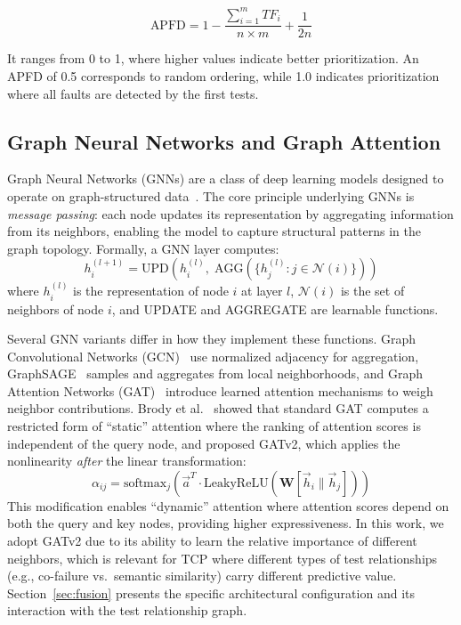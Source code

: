 \documentclass[10pt,journal,compsoc]{IEEEtran}
\begin{document}
\begin{equation}
    \text{APFD} = 1 - \frac{\sum_{i=1}^{m} TF_i}{n \times m} + \frac{1}{2n}
\end{equation}

It ranges from 0 to 1, where higher values indicate better prioritization.
An APFD of 0.5 corresponds to random ordering, while 1.0 indicates
prioritization where all faults are detected by the first tests.

\subsection{Graph Neural Networks and Graph Attention}
\label{sec:bg_gnn}

Graph Neural Networks (GNNs) are a class of deep learning models designed to
operate on graph-structured data~\cite{wu2021comprehensive}. The core principle
underlying GNNs is \emph{message passing}: each node updates its representation
by aggregating information from its neighbors, enabling the model to capture
structural patterns in the graph topology. Formally, a GNN layer computes:
\begin{equation}
    h_i^{(l+1)} = \text{UPD}\!\left(h_i^{(l)},\; \text{AGG}\!\left(\{h_j^{(l)} : j \in \mathcal{N}(i)\}\right)\right)
\end{equation}
where $h_i^{(l)}$ is the representation of node $i$ at layer $l$, $\mathcal{N}(i)$
is the set of neighbors of node $i$, and UPDATE and AGGREGATE are learnable functions.

Several GNN variants differ in how they implement these functions.
Graph Convolutional Networks (GCN)~\cite{kipf2017semi} use normalized adjacency
for aggregation, GraphSAGE~\cite{hamilton2017inductive} samples and aggregates
from local neighborhoods, and Graph Attention Networks
(GAT)~\cite{velickovic2018graph} introduce learned attention mechanisms to
weigh neighbor contributions. Brody et al.~\cite{brody2022attentive} showed
that standard GAT computes a restricted form of ``static'' attention where
the ranking of attention scores is independent of the query node, and proposed
GATv2, which applies the nonlinearity \emph{after} the linear transformation:
\begin{equation}
    \alpha_{ij} = \text{softmax}_j\left(\vec{a}^T \cdot \text{LeakyReLU}\left(\mathbf{W}[\vec{h}_i \| \vec{h}_j]\right)\right)
\end{equation}
This modification enables ``dynamic'' attention where attention scores depend
on both the query and key nodes, providing higher expressiveness. In this
work, we adopt GATv2 due to its ability to learn the relative importance of
different neighbors, which is relevant for TCP where different types of test
relationships (e.g., co-failure vs.\ semantic similarity) carry different
predictive value. Section~\ref{sec:fusion} presents the specific architectural
configuration and its interaction with the test relationship graph.
\end{document}
